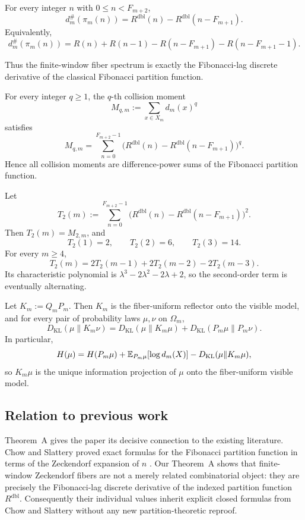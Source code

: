 \begin{theoremA}
For every integer \(n\) with \(0\le n<F_{m+2}\),
\[
  d_m^\#(\pi_m(n))
  =
  R^{\mathrm{dbl}}(n)-R^{\mathrm{dbl}}(n-F_{m+1}).
\]
Equivalently,
\[
  d_m^\#(\pi_m(n))
  =
  R(n)+R(n-1)-R(n-F_{m+1})-R(n-F_{m+1}-1).
\]
\end{theoremA}

\noindent
Thus the finite-window fiber spectrum is exactly the Fibonacci-lag discrete
derivative of the classical Fibonacci partition function.

\begin{theoremB}
For every integer \(q\ge 1\), the \(q\)-th collision moment
\[
  M_{q,m}:=\sum_{x\in X_m} d_m(x)^q
\]
satisfies
\[
  M_{q,m}
  =
  \sum_{n=0}^{F_{m+2}-1}
  \bigl(R^{\mathrm{dbl}}(n)-R^{\mathrm{dbl}}(n-F_{m+1})\bigr)^q.
\]
Hence all collision moments are difference-power sums of the Fibonacci
partition function.
\end{theoremB}

\begin{theoremC}
Let
\[
  T_2(m):=
  \sum_{n=0}^{F_{m+2}-1}
  \bigl(R^{\mathrm{dbl}}(n)-R^{\mathrm{dbl}}(n-F_{m+1})\bigr)^2.
\]
Then \(T_2(m)=M_{2,m}\), and
\[
  T_2(1)=2,\qquad T_2(2)=6,\qquad T_2(3)=14.
\]
For every \(m\ge 4\),
\[
  T_2(m)=2T_2(m-1)+2T_2(m-2)-2T_2(m-3).
\]
Its characteristic polynomial is \(\lambda^3-2\lambda^2-2\lambda+2\), so the
second-order term is eventually alternating.
\end{theoremC}

\begin{theoremD}
Let \(K_m:=Q_mP_m\).  Then \(K_m\) is the fiber-uniform reflector onto the
visible model, and for every pair of probability laws \(\mu,\nu\) on
\(\Omega_m\),
\[
  D_{\mathrm{KL}}(\mu\|K_m\nu)
  =
  D_{\mathrm{KL}}(\mu\|K_m\mu)
  +
  D_{\mathrm{KL}}(P_m\mu\|P_m\nu).
\]
In particular,
\[
  H(\mu)=H(P_m\mu)+\mathbb{E}_{P_m\mu}[\log d_m(X)]-D_{\mathrm{KL}}(\mu\|K_m\mu),
\]
so \(K_m\mu\) is the unique information projection of \(\mu\) onto the
fiber-uniform visible model.
\end{theoremD}

\subsection{Relation to previous work}

Theorem~A gives the paper its decisive connection to the existing literature.
Chow and Slattery proved exact formulas for the Fibonacci partition function in
terms of the Zeckendorf expansion of \(n\) \cite{ChowSlattery2021}.  Our
Theorem~A shows that finite-window Zeckendorf fibers are not a merely related
combinatorial object: they are precisely the Fibonacci-lag discrete derivative
of the indexed partition function \(R^{\mathrm{dbl}}\).  Consequently their
individual values inherit explicit closed formulas from Chow and Slattery
without any new partition-theoretic reproof.

